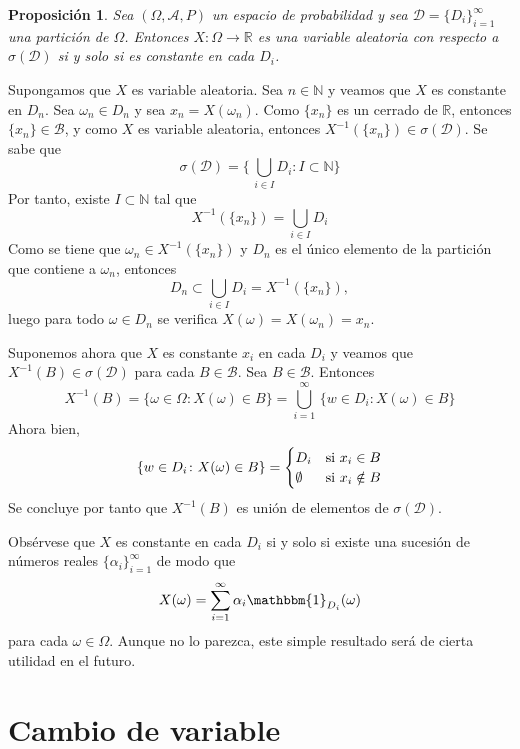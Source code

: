 \documentclass[11pt]{report}
\makeatletter
\renewenvironment{proof}[1][\proofname]{\par
  \pushQED{\qed}%
  \normalfont \topsep\z@skip %
  \trivlist
  \item[\hskip\labelsep
        \itshape
    #1\@addpunct{.}]\ignorespaces
}{%
  \popQED\endtrivlist\@endpefalse
}
\theoremstyle{mytheorem}
\newtheorem{proposition}{Proposición}
\theoremstyle{mydefinition}
\theoremstyle{myexample}
\let\oldproofname=\proofname
\renewcommand{\proofname}{\rm\bf{\oldproofname}}}
\newenvironment{cproposition} %
  {\begin{mdframed}[
        linewidth=3pt,
        linecolor=c2,
        bottomline=false,
        topline=false,
        rightline=false,
        innerrightmargin=0pt,
        innertopmargin=0pt,
        innerbottommargin=0pt,
        innerleftmargin=1em,
        skipabove=\baselineskip]
    \begin{proposition}}
  {\end{proposition}\end{mdframed}}
\newcommand{\R}{\mathbb R}
\newcommand{\N}{\mathbb N}
\makeatother
\begin{document}
\begin{cproposition}
Sea $(\Omega,\mathcal{A},P)$ un espacio de probabilidad y sea $\mathcal{D} = \{D_i\}_{i=1}^\infty$ una partición de $\Omega$. Entonces $X \colon \Omega \to \R$ es una variable aleatoria con respecto a $\sigma(\mathcal{D})$ si y solo si es constante en cada $D_i$.
\end{cproposition}

\begin{proof}
Supongamos que $X$ es variable aleatoria. Sea $n \in \N$ y veamos que $X$ es constante en $D_n$. Sea $\omega_n \in D_n$ y sea $x_n = X(\omega_n)$. Como $\{x_n\}$ es un cerrado de $\R$, entonces $\{x_n\} \in \mathcal{B}$, y como $X$ es variable aleatoria, entonces $X^{-1}(\{x_n\}) \in \sigma(\mathcal{D})$. Se sabe que
\[\sigma(\mathcal{D}) = \biggl\{\, \bigcup_{i \in I}D_i \colon I \subset \N\biggr\}\]
Por tanto, existe $I \subset \N$ tal que
\[X^{-1}(\{x_n\}) = \bigcup_{i \in I}D_i\]
Como se tiene que $\omega_n \in X^{-1}(\{x_n\})$ y $D_n$ es el único elemento de la partición que contiene a $\omega_n$, entonces
\[D_n \subset \bigcup_{i \in I}D_i = X^{-1}(\{x_n\}),\]
luego para todo $\omega \in D_n$ se verifica $X(\omega) = X(\omega_n) = x_n$.

\vspace{2mm}

Suponemos ahora que $X$ es constante $x_i$ en cada $D_i$ y veamos que $X^{-1}(B) \in \sigma(\mathcal{D})$ para cada $B \in \mathcal{B}$. Sea $B \in \mathcal{B}$. Entonces
\[X^{-1}(B) = \{\omega \in \Omega \colon X(\omega) \in B\} = \bigcup_{i=1}^{\infty}\, \{w \in D_i \colon X(\omega) \in B\}\]
Ahora bien,
\[\{w \in D_i \colon X(\omega) \in B\} = \begin{cases}
    D_i & $si$ \ x_i \in B \\
    \emptyset & $si$ \ x_i \notin B
\end{cases}\]
Se concluye por tanto que $X^{-1}(B)$ es unión de elementos de $\sigma(\mathcal{D})$.
\end{proof}

Obsérvese que $X$ es constante en cada $D_i$ si y solo si existe una sucesión de números reales $\{\alpha_i\}_{i=1}^\infty$ de modo que
\[X(\omega) = \sum_{i=1}^\infty \alpha_i \mathbbm{1}_{D_i}(\omega)\]
para cada $\omega \in \Omega$. Aunque no lo parezca, este simple resultado será de cierta utilidad en el futuro.

\section{Cambio de variable}
\end{document}
